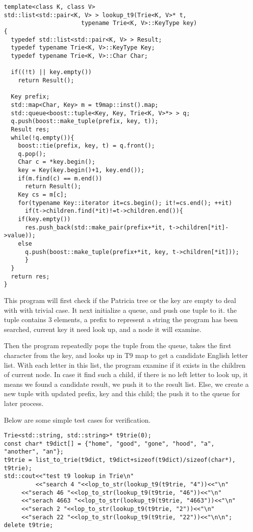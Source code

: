 \documentclass{article}
\begin{document}
\begin{lstlisting}
template<class K, class V>
std::list<std::pair<K, V> > lookup_t9(Trie<K, V>* t,
				      typename Trie<K, V>::KeyType key)
{
  typedef std::list<std::pair<K, V> > Result;
  typedef typename Trie<K, V>::KeyType Key;
  typedef typename Trie<K, V>::Char Char;

  if((!t) || key.empty())
    return Result();

  Key prefix;
  std::map<Char, Key> m = t9map::inst().map;
  std::queue<boost::tuple<Key, Key, Trie<K, V>*> > q;
  q.push(boost::make_tuple(prefix, key, t));
  Result res;
  while(!q.empty()){
    boost::tie(prefix, key, t) = q.front();
    q.pop();
    Char c = *key.begin();
    key = Key(key.begin()+1, key.end());
    if(m.find(c) == m.end())
      return Result();
    Key cs = m[c];
    for(typename Key::iterator it=cs.begin(); it!=cs.end(); ++it)
      if(t->children.find(*it)!=t->children.end()){
	if(key.empty())
	  res.push_back(std::make_pair(prefix+*it, t->children[*it]->value));
	else
	  q.push(boost::make_tuple(prefix+*it, key, t->children[*it]));
      }
  }
  return res;
}
\end{lstlisting}

This program will first check if the Patricia tree or the key are
empty to deal with with trivial case. It next initialize a queue, and
push one tuple to it. the tuple contains 3 elements, a prefix to
represent a string the program has been searched, current key it need
look up, and a node it will examine.

Then the program repeatedly pops the tuple from the queue, takes the
first character from the key, and looks up in T9 map to get a
candidate English letter list. With each letter in this list, the
program examine if it exists in the children of current node. In case
it find such a child, if there is no left letter to look up, it means
we found a candidate result, we push it to the result list. Else, we
create a new tuple with updated prefix, key and this child; the push
it to the queue for later process.

Below are some simple test cases for verification.

\begin{lstlisting}
Trie<std::string, std::string>* t9trie(0);
const char* t9dict[] = {"home", "good", "gone", "hood", "a", "another", "an"};
t9trie = list_to_trie(t9dict, t9dict+sizeof(t9dict)/sizeof(char*), t9trie);
std::cout<<"test t9 lookup in Trie\n"
         <<"search 4 "<<lop_to_str(lookup_t9(t9trie, "4"))<<"\n"
	 <<"serach 46 "<<lop_to_str(lookup_t9(t9trie, "46"))<<"\n"
	 <<"serach 4663 "<<lop_to_str(lookup_t9(t9trie, "4663"))<<"\n"
	 <<"serach 2 "<<lop_to_str(lookup_t9(t9trie, "2"))<<"\n"
	 <<"serach 22 "<<lop_to_str(lookup_t9(t9trie, "22"))<<"\n\n";
delete t9trie;
\end{lstlisting}
\end{document}
